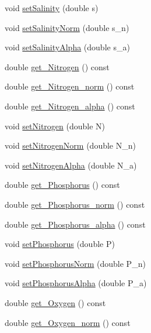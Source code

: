 \begin{DoxyCompactItemize}
void \mbox{\hyperlink{class_node_a7b7a24d04fd05f860a55bb4b27b08cf1}{set\+Salinity}} (double s)
\item 
void \mbox{\hyperlink{class_node_a142dc10f620b49fd8f66f2d1ad629743}{set\+Salinity\+Norm}} (double s\+\_\+n)
\item 
void \mbox{\hyperlink{class_node_ace97c2732d78a85d9531988515b99f1a}{set\+Salinity\+Alpha}} (double s\+\_\+a)
\item 
double \mbox{\hyperlink{class_node_ac74bf05cc20e1ae429279f036ecb3e6b}{get\+\_\+\+Nitrogen}} () const
\item 
double \mbox{\hyperlink{class_node_a9f122ae34ccbf47b4aed45177eed6ed3}{get\+\_\+\+Nitrogen\+\_\+norm}} () const
\item 
double \mbox{\hyperlink{class_node_aa2ef7c5a2ac1108aac7585324ba68ae7}{get\+\_\+\+Nitrogen\+\_\+alpha}} () const
\item 
void \mbox{\hyperlink{class_node_a7f9261a53758ad31390252390a4ce4f3}{set\+Nitrogen}} (double N)
\item 
void \mbox{\hyperlink{class_node_a304aa1ab371323cd546c8eb6f3ce6bfa}{set\+Nitrogen\+Norm}} (double N\+\_\+n)
\item 
void \mbox{\hyperlink{class_node_a3a03387e4912203d4c0188b610f0128d}{set\+Nitrogen\+Alpha}} (double N\+\_\+a)
\item 
double \mbox{\hyperlink{class_node_a16934c9bbdb08bb051d0bf191b2b707c}{get\+\_\+\+Phosphorus}} () const
\item 
double \mbox{\hyperlink{class_node_ab0495b500c8b58d160e979e35e9f7df6}{get\+\_\+\+Phosphorus\+\_\+norm}} () const
\item 
double \mbox{\hyperlink{class_node_a1a77dc13290f5876e2f948a3ad85af62}{get\+\_\+\+Phosphorus\+\_\+alpha}} () const
\item 
void \mbox{\hyperlink{class_node_a3bb891cf14f9e23ba347562f4f63a660}{set\+Phosphorus}} (double P)
\item 
void \mbox{\hyperlink{class_node_a41a38a1054027e405921301b9fe127e7}{set\+Phosphorus\+Norm}} (double P\+\_\+n)
\item 
void \mbox{\hyperlink{class_node_a5b80655f432a07064c839e7d21558694}{set\+Phosphorus\+Alpha}} (double P\+\_\+a)
\item 
double \mbox{\hyperlink{class_node_abe2434f3e1e0847c386a25aa281f2076}{get\+\_\+\+Oxygen}} () const
\item 
double \mbox{\hyperlink{class_node_aebcd3bc20e59393353b437f7f870b0e4}{get\+\_\+\+Oxygen\+\_\+norm}} () const
\item 

\end{DoxyCompactItemize}
